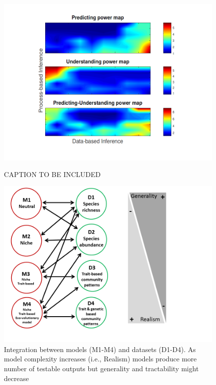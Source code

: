 \documentclass[12pt,a4paper]{article}
\begin{document}
\begin{figure}[H]
	 \centering
	 \includegraphics[width = 1\textwidth]{Fig1.png}
	 \\
	 \caption{CAPTION TO BE INCLUDED}
      \end{figure}

\begin{figure}[H]
	\centering
	\includegraphics[width = 1\textwidth]{Fig2.png}
	\caption{Integration between models (M1-M4) and datasets (D1-D4). As model complexity increases (i.e., Realism) models produce more number of testable outputs but generality and tractability might decrease}
\end{figure}


\newpage


\end{document}
